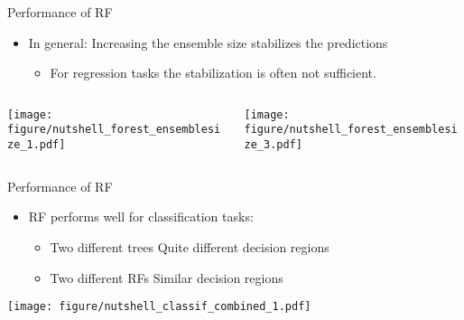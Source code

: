 \documentclass[11pt,compress,t,notes=noshow, xcolor=table]{beamer}
\begin{document}
\begin{vbframe}{Performance of RF}
\begin{itemize}
\item \small In general: Increasing the ensemble size stabilizes the predictions
    \begin{itemize}
        \item \small For regression tasks the stabilization is often not sufficient. 
    \end{itemize}

\end{itemize}
\begin{columns}  
\begin{column}{0.5\textwidth} 
\begin{center}
 \texttt{[image: figure/nutshell\_forest\_ensemblesize\_1.pdf]}
 \end{center}
\end{column}
\begin{column}{0.5\textwidth} 
\begin{center}
  \texttt{[image: figure/nutshell\_forest\_ensemblesize\_3.pdf]}
\end{center}
\end{column}
\end{columns}

\end{vbframe}

\begin{vbframe}{Performance of RF}

    \begin{itemize}
        \item \small RF performs well for classification tasks:
        \begin{itemize}
            \item \small Two different trees \textrightarrow Quite different decision regions
            \item \small Two different RFs \textrightarrow Similar decision regions
        \end{itemize}
    \end{itemize}
\begin{center}
 \texttt{[image: figure/nutshell\_classif\_combined\_1.pdf]}
\end{center}




\end{vbframe}
\end{document}
